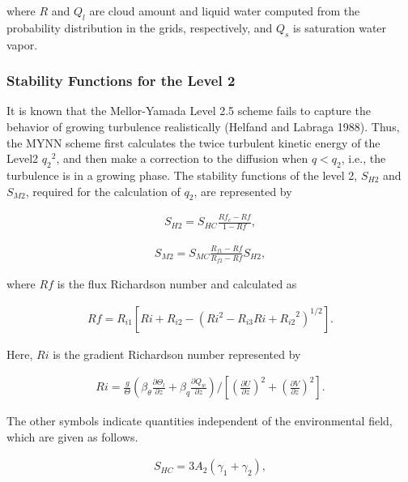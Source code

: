 where \(R\) and \(Q_l\) are cloud amount and liquid water computed from the probability distribution in the grids, respectively, and \(Q_s\) is saturation water vapor.

\hypertarget{stability-functions-for-the-level-2}{%
\subsubsection{Stability Functions for the Level 2}\label{stability-functions-for-the-level-2}}

It is known that the Mellor-Yamada Level 2.5 scheme fails to capture the behavior of growing turbulence realistically (Helfand and Labraga 1988). Thus, the MYNN scheme first calculates the twice
turbulent kinetic energy of the Level2 \({q_2}^2\), and then make a correction to the diffusion when \(q<q_2\), i.e., the turbulence is in a growing phase. The stability functions of the level 2,
\(S_{H2}\) and \(S_{M2}\), required for the calculation of \(q_2\), are represented by

\begin{eqnarray}S_{H2}=S_{HC}\frac{Rf_c-Rf}{1-Rf},\end{eqnarray}

\begin{eqnarray}S_{M2}=S_{MC}\frac{R_{f1}-Rf}{R_{f2}-Rf}S_{H2},\end{eqnarray}

where \(Rf\) is the flux Richardson number and calculated as

\begin{eqnarray}Rf=R_{i1}\left[Ri+R_{i2}-(Ri^2-R_{i3}Ri+{R_{i2}}^2)^{1/2}\right].\end{eqnarray}

Here, \(Ri\) is the gradient Richardson number represented by

\begin{eqnarray}Ri=\frac{g}{\Theta}\left(\beta_\theta \frac{\partial \Theta_l}{\partial z}+\beta_q \frac{\partial Q_w}{\partial z}\right) \Bigg/ \left[ \left(\frac{\partial U}{\partial z}\right)^2+\left(\frac{\partial V}{\partial z}\right)^2 \right].\end{eqnarray}

The other symbols indicate quantities independent of the environmental field, which are given as follows.

\begin{eqnarray}S_{HC}=3A_2(\gamma_1+\gamma_2),\end{eqnarray}

